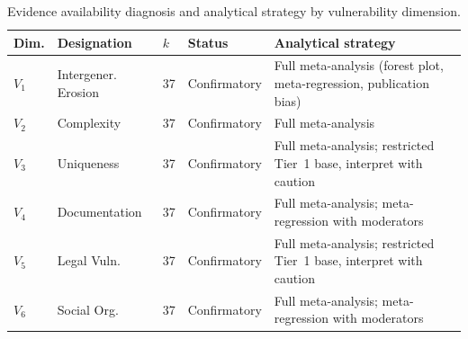 \documentclass[12pt,a4paper]{article}
\begin{document}
\begin{table}[H]
\caption{Evidence availability diagnosis and analytical strategy by vulnerability dimension.}
\label{tab:viability}
\centering
\small
\begin{tabular}{p{0.8cm}p{2.2cm}p{1.2cm}p{2.0cm}p{5.5cm}}
\toprule
\textbf{Dim.} & \textbf{Designation} & \textbf{$k$} & \textbf{Status} & \textbf{Analytical strategy} \\
\midrule
$V_1$ & Intergener. Erosion & 37 & Confirmatory & Full meta-analysis (forest plot, meta-regression, publication bias) \\
$V_2$ & Complexity & 37 & Confirmatory & Full meta-analysis \\
$V_3$ & Uniqueness & 37 & Confirmatory & Full meta-analysis; restricted Tier~1 base, interpret with caution \\
$V_4$ & Documentation & 37 & Confirmatory & Full meta-analysis; meta-regression with moderators \\
$V_5$ & Legal Vuln. & 37 & Confirmatory & Full meta-analysis; restricted Tier~1 base, interpret with caution \\
$V_6$ & Social Org. & 37 & Confirmatory & Full meta-analysis; meta-regression with moderators \\
\bottomrule
\end{tabular}
\end{table}
\end{document}
